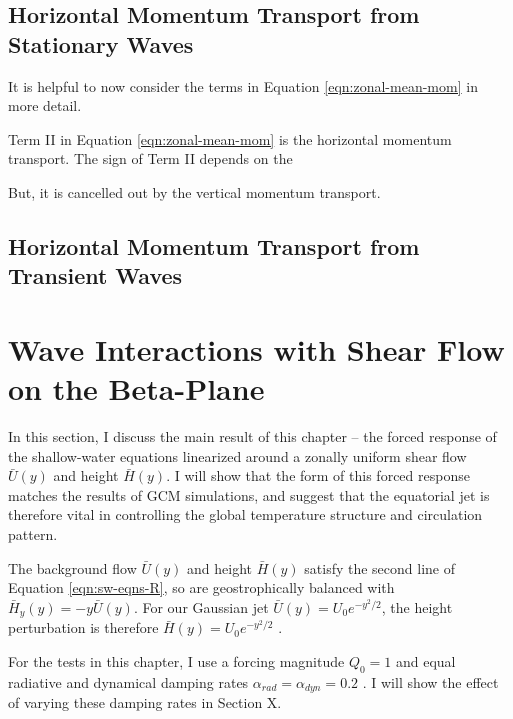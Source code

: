 \subsection{Horizontal Momentum Transport from Stationary Waves}

It is helpful to now consider the terms in Equation \ref{eqn:zonal-mean-mom} in more detail.

Term II in Equation \ref{eqn:zonal-mean-mom} is the horizontal momentum transport. The sign of Term II depends on the

But, it is cancelled out by the vertical momentum transport.


\subsection{Horizontal Momentum Transport from Transient Waves}






\section{Wave Interactions with Shear Flow on the Beta-Plane}\label{sec:shear-flow-beta-plane}

In this section, I discuss the main result of this chapter -- the forced response of the shallow-water equations linearized around a zonally uniform shear flow $\bar{U}(y)$ and height $\bar{H}(y)$. I will show that the form of this forced response matches the results of GCM simulations, and suggest that the equatorial jet is therefore vital in controlling the global temperature structure and circulation pattern.

The background flow $\bar{U}(y)$ and height $\bar{H}(y)$ satisfy the second line of Equation \ref{eqn:sw-eqns-R}, so are geostrophically balanced with $\bar{H}_{y}(y)=-y\bar{U}(y)$. For our Gaussian jet $\bar{U}(y)=U_{0}e^{-y^{2}/2}$, the height perturbation is therefore $\bar{H}(y)=U_{0}e^{-y^{2}/2}$ \citep{hammond2018wavemean}.

For the tests in this chapter, I use a forcing magnitude $Q_{0}=1$ and equal radiative and dynamical damping rates $\alpha_{rad}=\alpha_{dyn} = 0.2$ \citep{matsuno1966quasi}. I will show the effect of varying these damping rates in Section X.

